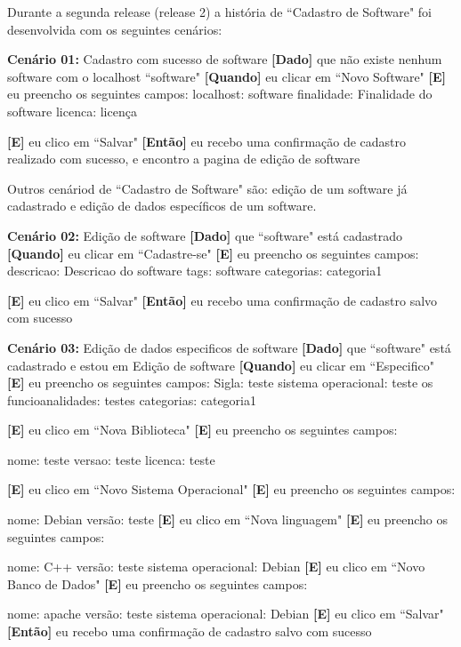 Durante a segunda release (release 2) a história de ``Cadastro de Software" foi desenvolvida com os seguintes cenários:

\textbf{Cenário 01:} Cadastro com sucesso de software
	\textbf{[Dado]} que não existe nenhum software com o localhost ``software"
	\textbf{[Quando]} eu clicar em ``Novo Software"
	\textbf{[E]} eu preencho os seguintes campos: 
  		localhost: software 
  		finalidade: Finalidade do software
  		licenca: licença
  		
  		
	\textbf{[E]} eu clico em ``Salvar"
	\textbf{[Então]} eu recebo uma confirmação de cadastro realizado com sucesso, e encontro a pagina de edição de software


Outros cenáriod de ``Cadastro de Software" são: edição de um software já cadastrado e edição de dados específicos de um software.

\textbf{Cenário 02:} Edição de software
	\textbf{[Dado]} que ``software" está cadastrado
	\textbf{[Quando]} eu clicar em ``Cadastre-se"
	\textbf{[E]} eu preencho os seguintes campos: 
  		descricao: Descricao do software 
  		tags: software
  		categorias: categoria1
 
	\textbf{[E]} eu clico em ``Salvar"
	\textbf{[Então]} eu recebo uma confirmação de cadastro salvo com sucesso


\textbf{Cenário 03:} Edição de dados especificos de software
	\textbf{[Dado]} que ``software" está cadastrado e estou em Edição de software
	\textbf{[Quando]} eu clicar em ``Especifico"
	\textbf{[E]} eu preencho os seguintes campos: 
  		Sigla: teste 
  		sistema operacional: teste os
  		funcioanalidades: testes
  		categorias: categoria1
 	
 	\textbf{[E]} eu clico em ``Nova Biblioteca"
 	\textbf{[E]} eu preencho os seguintes campos: 

 		nome: teste
 		versao: teste
 		licenca: teste

 	\textbf{[E]} eu clico em ``Novo Sistema Operacional"
 	\textbf{[E]} eu preencho os seguintes campos: 

 		nome: Debian
 		versão: teste
 	\textbf{[E]} eu clico em ``Nova linguagem"
 	\textbf{[E]} eu preencho os seguintes campos: 

 		nome: C++
 		versão: teste
 		sistema operacional: Debian
 	\textbf{[E]} eu clico em ``Novo Banco de Dados"
 	\textbf{[E]} eu preencho os seguintes campos: 

 		nome: apache
 		versão: teste
 		sistema operacional: Debian
	\textbf{[E]} eu clico em ``Salvar"
	\textbf{[Então]} eu recebo uma confirmação de cadastro salvo com sucesso


